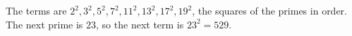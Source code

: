 The terms are $2^2,3^2,5^2,7^2,11^2,13^2,17^2,19^2$, the squares of the primes in order. The next prime is $23$, so the next term is $23^2=\boxed{529}$.
